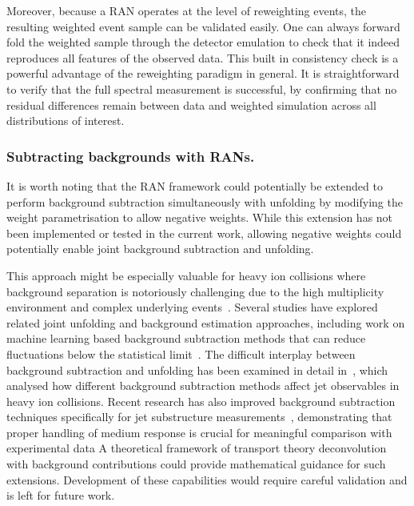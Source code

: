{{        Moreover, because a RAN operates at the level of reweighting events, the resulting weighted event sample can be validated easily.
        One can always forward fold the weighted sample through the detector emulation to check that it indeed reproduces all features of the observed data.
        This built in consistency check is a powerful advantage of the reweighting paradigm in general.
        It is straightforward to verify that the full spectral measurement is successful, by confirming that no residual differences remain between data and weighted simulation across all distributions of interest.

        \subsubsection{Subtracting backgrounds with RANs.}
        
        It is worth noting that the RAN framework could potentially be extended to perform background subtraction simultaneously with unfolding by modifying the weight parametrisation to allow negative weights.
        While this extension has not been implemented or tested in the current work, allowing negative weights could potentially enable joint background subtraction and unfolding.
            
            This approach might be especially valuable for heavy ion collisions where background separation is notoriously challenging due to the high multiplicity environment and complex underlying events~\cite{Mengel:2024fcl}.
            Several studies have explored related joint unfolding and background estimation approaches, including work on machine learning based background subtraction methods that can reduce fluctuations below the statistical limit~\cite{Haake:2018hqn, Do_2023, Mengel:2024fcl}.
            The difficult interplay between background subtraction and unfolding has been examined in detail in~\cite{Apolinario:2012cg}, which analysed how different background subtraction methods affect jet observables in heavy ion collisions.
            Recent research has also improved background subtraction techniques specifically for jet substructure measurements~\cite{Milhano:2022kzx}, demonstrating that proper handling of medium response is crucial for meaningful comparison with experimental data
            A theoretical framework of transport theory deconvolution with background contributions could provide mathematical guidance for such extensions.
            Development of these capabilities would require careful validation and is left for future work.

}}
